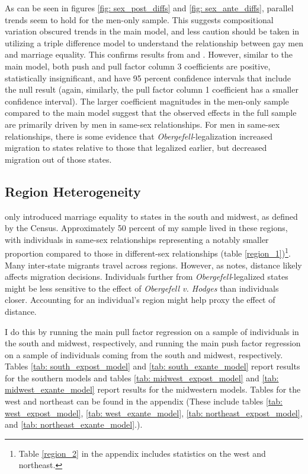 \documentclass[12pt,letterpaper]{article}
\begin{document}
As can be seen in figures \ref{fig: sex_post_diffs} and \ref{fig: sex_ante_diffs}, parallel trends seem to hold for the men-only sample. This suggests compositional variation obscured trends in the main model, and less caution should be taken in utilizing a triple difference model to understand the relationship between gay men and marriage equality. This confirms results from \citet{1} and \citet{12}. However, similar to the main model, both push and pull factor column 3 coefficients are positive, statistically insignificant, and have 95 percent confidence intervals that include the null result (again, similarly, the pull factor column 1 coefficient has a smaller confidence interval). The larger coefficient magnitudes in the men-only sample compared to the main model suggest that the observed effects in the full sample are primarily driven by men in same-sex relationships. For men in same-sex relationships, there is some evidence that \textit{Obergefell}-legalization increased migration to states relative to those that legalized earlier, but decreased migration out of those states.

\FloatBarrier
\subsection{Region Heterogeneity}

 only introduced marriage equality to states in the south and midwest, as defined by the Census. Approximately 50 percent of my sample lived in these regions, with individuals in same-sex relationships representing a notably smaller proportion compared to those in different-sex relationships (table \ref{region_1})\footnote{Table \ref{region_2} in the appendix includes statistics on the west and northeast.}. Many inter-state migrants travel across regions. However, as \citet{1} notes, distance likely affects migration decisions. Individuals further from \textit{Obergefell}-legalized states might be less sensitive to the effect of \textit{Obergefell v. Hodges} than individuals closer. Accounting for an individual’s region might help proxy the effect of distance.


I do this by running the main pull factor regression on a sample of individuals in the south and midwest, respectively, and running the main push factor regression on a sample of individuals coming from the south and midwest, respectively. Tables \ref{tab: south_expost_model} and \ref{tab: south_exante_model} report results for the southern models and tables \ref{tab: midwest_expost_model} and \ref{tab: midwest_exante_model} report results for the midwestern models. Tables for the west and northeast can be found in the appendix (These include tables \ref{tab: west_expost_model}, \ref{tab: west_exante_model}, \ref{tab: northeast_expost_model}, and \ref{tab: northeast_exante_model}.).
\end{document}
